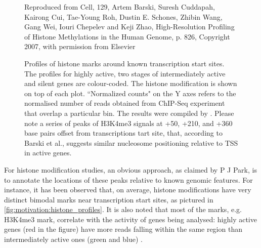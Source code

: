 \documentclass[parskip]{cs4rep}
\newcommand{\histonemodification}[1]{#1}
\begin{document}
\begin{figure}[p]
   \centering
   {Reproduced from Cell, 129, Artem Barski, Suresh Cuddapah, Kairong Cui, Tae-Young Roh, Dustin E. Schones, Zhibin Wang, Gang Wei, Iouri Chepelev and Keji Zhao, High-Resolution Profiling of Histone Methylations in the Human Genome\cite{Barski:2007ww}, p. 826, Copyright 2007, with permission from Elsevier}
   \caption{Profiles of histone marks around known transcription start sites. The profiles for highly active, two stages of intermediately active and silent genes are colour-coded. The histone modification is shown on top of each plot. ``Normalized counts" on the Y axes refers to the normalised number of reads obtained from ChIP-Seq experiment that overlap a particular bin. The results were compiled by \cite{Barski:2007ww}. Please note a series of peaks of H3K4me3 signals at +50, +210, and +360 base pairs offset from transcriptions tart site, that, according to Barski et al., suggests similar nucleosome positioning relative to TSS in active genes.}
    \label{fig:motivation:histone_profiles}
\end{figure}

For histone modification studies, an obvious approach, as claimed by P J Park, is to annotate the locations of these peaks relative to known genomic features. For instance, it has been observed
that, on average, histone modifications have very distinct bimodal marks near transcription start sites, as pictured in \autoref{fig:motivation:histone_profiles}. It is also noted that most of the marks, e.g.
\histonemodification{H3K4me3} mark, correlate with the activity of genes being analysed: highly active genes (red in the figure) have more reads falling within the same region than intermediately active ones (green and blue) \cite{Barski:2007ww}.
\end{document}
